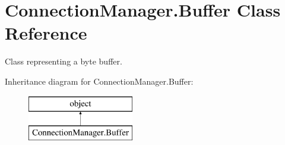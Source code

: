 \hypertarget{class_connection_manager_1_1_buffer}{\section{Connection\-Manager.\-Buffer Class Reference}
\label{class_connection_manager_1_1_buffer}
}


Class representing a byte buffer.  


Inheritance diagram for Connection\-Manager.\-Buffer\-:\begin{figure}[H]
\begin{center}
\leavevmode
\includegraphics[height=2.000000cm]{class_connection_manager_1_1_buffer}
\end{center}
\end{figure}
